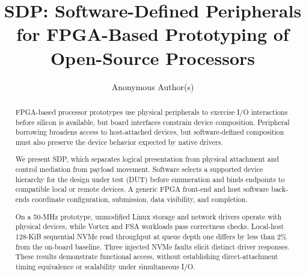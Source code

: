 \documentclass[sigconf,anonymous]{acmart}
\newcommand{\sys}{SDP\xspace}
\begin{document}
\title[SDP: Software-Defined Peripherals]{SDP: Software-Defined Peripherals for FPGA-Based Prototyping of Open-Source Processors}
\author{Anonymous Author(s)}

\begin{abstract}
FPGA-based processor prototypes use physical peripherals to exercise I/O
interactions before silicon is available, but board interfaces constrain device
composition. Peripheral borrowing broadens access to host-attached devices, but
software-defined composition must also preserve the device
behavior expected by native drivers.

We present \sys, which separates logical presentation from physical attachment
and control mediation from payload movement. Software selects a supported device hierarchy for the design under test (DUT) before
enumeration and binds endpoints to compatible local or remote devices. A generic
FPGA front-end and host software back-ends coordinate configuration, submission,
data visibility, and completion.

On a 50-MHz prototype, unmodified Linux storage and network drivers operate with
physical devices, while Vortex and FSA workloads pass correctness checks.
Local-host 128-KiB sequential NVMe read throughput at queue
depth one differs by less than 2\% from the on-board baseline. Three injected NVMe faults elicit distinct driver
responses. These results demonstrate functional access, without establishing
direct-attachment timing equivalence or scalability under simultaneous I/O.
\end{abstract}



\maketitle











\end{document}
